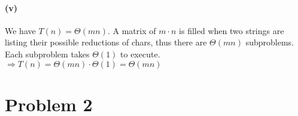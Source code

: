 \documentclass[11pt]{article}
\begin{document}
\paragraph{(v)}
We have $T(n) = \Theta(mn)$. A matrix of $m \cdot n$ is filled when two strings are listing their possible reductions of chars, thus there are $\Theta(mn)$ subproblems. Each subproblem takes $\Theta(1)$ to execute.\\
$\Longrightarrow T(n) =  \Theta(mn) \cdot \Theta(1) =  \Theta(mn)$

\section{Problem 2}


%
% 
% 
\end{document}
